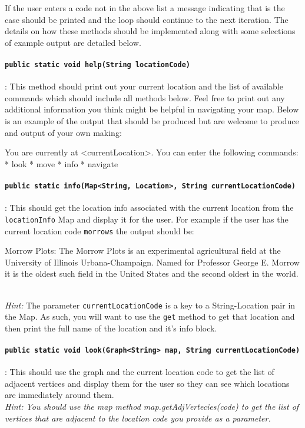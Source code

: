 \documentclass[a4paper]{article}
\begin{document}
 If the user enters a code not in the above list a message indicating that is
 the case should be printed and the loop should continue to the next iteration.
 The details on how these methods should be implemented along with some
 selections of example output are detailed below.


\paragraph{\lstinline|public static void help(String locationCode)|}: This
method should print out your current location and the list of available
commands which should include all methods below. Feel free to print out any
additional information you think might be helpful in navigating your map. Below
is an example of the output that should be produced but are welcome to produce 
and output of your own making:
\begin{shell}
You are currently at <currentLocation>. You can enter the following commands:
    * look
    * move
    * info
    * navigate
\end{shell}

\paragraph{\lstinline|public static info(Map<String, Location>, String
currentLocationCode)|}: This should get the location info associated with the
current location from the \lstinline|locationInfo| Map and display it for
the user. For example if the user has the current location code
\texttt{morrows} the output should be:
\begin{shell}
Morrow Plots:  The Morrow Plots is an experimental agricultural field 
at the University of Illinois Urbana-Champaign. Named for Professor 
George E. Morrow it is the oldest such field in the United States and 
the second oldest in the world.  
\end{shell}
\\
\textit{Hint:} The parameter \lstinline|currentLocationCode| is a key to a
String-Location pair in the Map. As such, you will want to use the
\lstinline|get| method to get that location and then print the full name of the
location and it's info block.


\paragraph{\lstinline|public static void look(Graph<String> map, String
currentLocationCode)|}: This should use the graph and the current location code
to get the list of adjacent vertices and display them for the user so they can
see which locations are immediately around them.
\\
\textit{Hint: You should use the map method map.getAdjVertecies(code) to get
the list of vertices that are adjacent to the location code you provide as
a parameter.}
\end{document}
